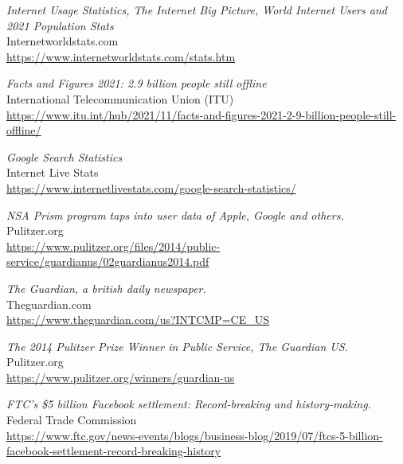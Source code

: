 \begin{thebibliography}{1}

    \emph{
    Internet Usage Statistics, The Internet Big Picture, World Internet Users
        and 2021 Population Stats
    }
    \\
    \color{gray}
Internetworldstats.com
    \\
    \color{black}
    \scriptsize{
        \url{
        https://www.internetworldstats.com/stats.htm
        }
}
\normalsize


    \emph{Facts and Figures 2021: 2.9 billion people still offline}
    \\
    \color{gray}
    International Telecommunication Union (ITU)
    \\
    \color{black}
    \scriptsize{
        \url{
https://www.itu.int/hub/2021/11/facts-and-figures-2021-2-9-billion-people-still-offline/
        }
    }
    \normalsize

\emph{Google Search Statistics}
\\
\color{gray}
Internet Live Stats
\\
\color{black}
\scriptsize{
    \url{
https://www.internetlivestats.com/google-search-statistics/
        }
}
\normalsize

\emph{
NSA Prism program taps into user data of Apple, Google and others.
}
\\
\color{gray}
Pulitzer.org
\\
\color{black}
\scriptsize{
    \url{
https://www.pulitzer.org/files/2014/public-service/guardianus/02guardianus2014.pdf
            }
}
\normalsize

    \emph{
        The Guardian, a british daily newspaper.
    }
    \\
    \color{gray}
    Theguardian.com
    \\
    \color{black}
    \scriptsize{
        \url{
https://www.theguardian.com/us?INTCMP=CE_US
            }
    }
    \normalsize

\emph{
    The 2014 Pulitzer Prize Winner in Public Service, The Guardian US.
}
\\
\color{gray}
Pulitzer.org
\\
\color{black}
\scriptsize{
    \url{
https://www.pulitzer.org/winners/guardian-us
            }
}
\normalsize

\emph{
    FTC’s \$5 billion Facebook settlement: Record-breaking and history-making.
}
\\
\color{gray}
    Federal Trade Commission
\\
\color{black}
\tiny{
    \url{
https://www.ftc.gov/news-events/blogs/business-blog/2019/07/ftcs-5-billion-facebook-settlement-record-breaking-history
            }
}
\normalsize


\end{thebibliography}
